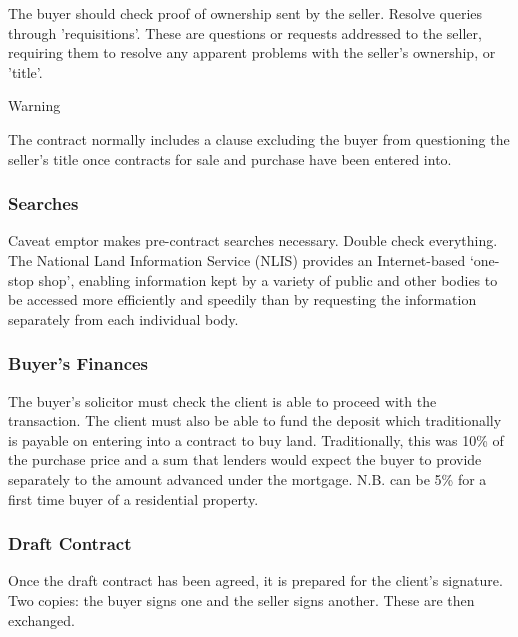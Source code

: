 \documentclass[
]{article}
\newenvironment{env-7ede146d-a28c-46fa-985d-64c388b7528b}
{
    \savenotes\tcolorbox[blanker,breakable,left=5pt,borderline west={2pt}{-4pt}{orange}]
}
{
    \endtcolorbox\spewnotes
}
\begin{document}
The buyer should check proof of ownership sent by the seller. Resolve
queries through 'requisitions'. These are questions or requests
addressed to the seller, requiring them to resolve any apparent problems
with the seller's ownership, or 'title'.

\begin{env-7ede146d-a28c-46fa-985d-64c388b7528b}

Warning

The contract normally includes a clause excluding the buyer from
questioning the seller's title once contracts for sale and purchase have
been entered into.

\end{env-7ede146d-a28c-46fa-985d-64c388b7528b}

\hypertarget{searches}{%
\subsubsection{Searches}\label{searches}}

Caveat emptor makes pre-contract searches necessary. Double check
everything. The National Land Information Service (NLIS) provides an
Internet-based `one-stop shop', enabling information kept by a variety
of public and other bodies to be accessed more efficiently and speedily
than by requesting the information separately from each individual body.

\hypertarget{buyers-finances}{%
\subsubsection{Buyer's Finances}\label{buyers-finances}}

The buyer's solicitor must check the client is able to proceed with the
transaction. The client must also be able to fund the deposit which
traditionally is payable on entering into a contract to buy land.
Traditionally, this was 10\% of the purchase price and a sum that
lenders would expect the buyer to provide separately to the amount
advanced under the mortgage. N.B. can be 5\% for a first time buyer of a
residential property.

\hypertarget{draft-contract}{%
\subsubsection{Draft Contract}\label{draft-contract}}

Once the draft contract has been agreed, it is prepared for the client's
signature. Two copies: the buyer signs one and the seller signs another.
These are then exchanged.
\end{document}
